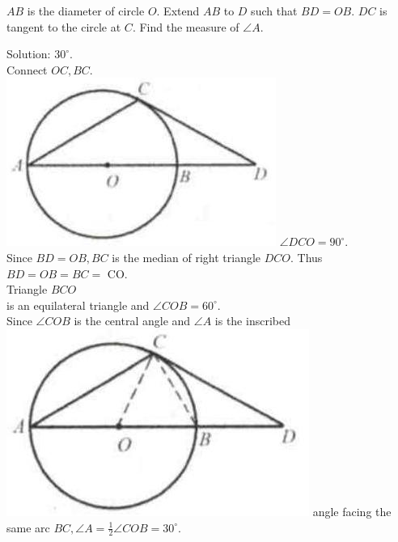 \documentclass{article}
\begin{document}
\(A B\) is the diameter of circle \(O\). Extend \(A B\) to \(D\) such that \(B D=O B\). \(D C\) is tangent to the circle at \(C\). Find the measure of \(\angle A\).

Solution: \(30^{\circ}\).\\
Connect \(O C, B C\).\\
\includegraphics[width=\textwidth]{images/151(4).jpg} \(\angle D C O=90^{\circ}\).\\
Since \(B D=O B, B C\) is the median of right triangle \(D C O\). Thus \(B D=O B=B C=\) CO.\\
Triangle \(B C O\)\\
is an equilateral triangle and \(\angle C O B=60^{\circ}\).\\
Since \(\angle C O B\) is the central angle and \(\angle A\) is the inscribed\\
\includegraphics[width=\textwidth]{images/151.jpg} angle facing the same arc \(B C, \angle A=\frac{1}{2} \angle C O B=30^{\circ}\).
\end{document}

